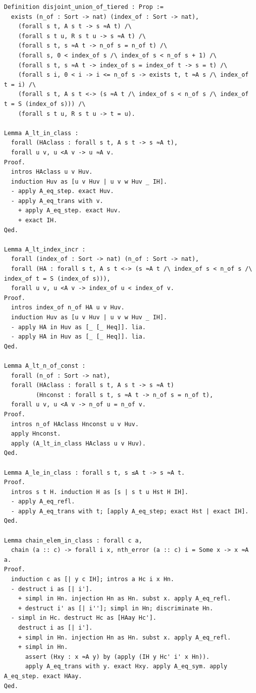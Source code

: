 \begin{latin}
\begin{verbatim}
Definition disjoint_union_of_tiered : Prop :=
  exists (n_of : Sort -> nat) (index_of : Sort -> nat),
    (forall s t, A s t -> s ≈A t) /\
    (forall s t u, R s t u -> s ≈A t) /\
    (forall s t, s ≈A t -> n_of s = n_of t) /\
    (forall s, 0 < index_of s /\ index_of s < n_of s + 1) /\
    (forall s t, s ≈A t -> index_of s = index_of t -> s = t) /\
    (forall s i, 0 < i -> i <= n_of s -> exists t, t ≈A s /\ index_of t = i) /\
    (forall s t, A s t <-> (s ≈A t /\ index_of s < n_of s /\ index_of t = S (index_of s))) /\
    (forall s t u, R s t u -> t = u).

Lemma A_lt_in_class :
  forall (HAclass : forall s t, A s t -> s ≈A t),
  forall u v, u <A v -> u ≈A v.
Proof.
  intros HAclass u v Huv.
  induction Huv as [u v Huv | u v w Huv _ IH].
  - apply A_eq_step. exact Huv.
  - apply A_eq_trans with v.
    + apply A_eq_step. exact Huv.
    + exact IH.
Qed.

Lemma A_lt_index_incr :
  forall (index_of : Sort -> nat) (n_of : Sort -> nat),
  forall (HA : forall s t, A s t <-> (s ≈A t /\ index_of s < n_of s /\ index_of t = S (index_of s))),
  forall u v, u <A v -> index_of u < index_of v.
Proof.
  intros index_of n_of HA u v Huv.
  induction Huv as [u v Huv | u v w Huv _ IH].
  - apply HA in Huv as [_ [_ Heq]]. lia.
  - apply HA in Huv as [_ [_ Heq]]. lia.
Qed.

Lemma A_lt_n_of_const :
  forall (n_of : Sort -> nat),
  forall (HAclass : forall s t, A s t -> s ≈A t)
         (Hnconst : forall s t, s ≈A t -> n_of s = n_of t),
  forall u v, u <A v -> n_of u = n_of v.
Proof.
  intros n_of HAclass Hnconst u v Huv.
  apply Hnconst.
  apply (A_lt_in_class HAclass u v Huv).
Qed.

Lemma A_le_in_class : forall s t, s ≤A t -> s ≈A t.
Proof.
  intros s t H. induction H as [s | s t u Hst H IH].
  - apply A_eq_refl.
  - apply A_eq_trans with t; [apply A_eq_step; exact Hst | exact IH].
Qed.

Lemma chain_elem_in_class : forall c a,
  chain (a :: c) -> forall i x, nth_error (a :: c) i = Some x -> x ≈A a.
Proof.
  induction c as [| y c IH]; intros a Hc i x Hn.
  - destruct i as [| i'].
    + simpl in Hn. injection Hn as Hn. subst x. apply A_eq_refl.
    + destruct i' as [| i'']; simpl in Hn; discriminate Hn.
  - simpl in Hc. destruct Hc as [HAay Hc'].
    destruct i as [| i'].
    + simpl in Hn. injection Hn as Hn. subst x. apply A_eq_refl.
    + simpl in Hn.
      assert (Hxy : x ≈A y) by (apply (IH y Hc' i' x Hn)).
      apply A_eq_trans with y. exact Hxy. apply A_eq_sym. apply A_eq_step. exact HAay. 
Qed.


\end{verbatim}
\end{latin}
